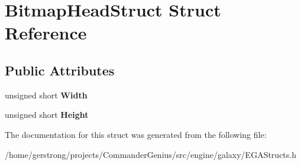 \hypertarget{struct_bitmap_head_struct}{
\section{BitmapHeadStruct Struct Reference}
\label{struct_bitmap_head_struct}
}
\subsection*{Public Attributes}
\begin{DoxyCompactItemize}
\item 
\hypertarget{struct_bitmap_head_struct_a20c1821c78e5f565dbbcf4142d76f155}{
unsigned short {\bfseries Width}}
\label{struct_bitmap_head_struct_a20c1821c78e5f565dbbcf4142d76f155}

\item 
\hypertarget{struct_bitmap_head_struct_ae38c645f42cf7d94d8dcb9b9c16e9cdb}{
unsigned short {\bfseries Height}}
\label{struct_bitmap_head_struct_ae38c645f42cf7d94d8dcb9b9c16e9cdb}

\end{DoxyCompactItemize}


The documentation for this struct was generated from the following file:\begin{DoxyCompactItemize}
\item 
/home/gerstrong/projects/CommanderGenius/src/engine/galaxy/EGAStructs.h\end{DoxyCompactItemize}
